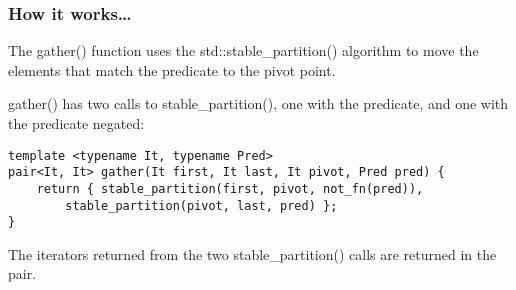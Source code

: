 \subsubsection{How it works…}

The gather() function uses the std::stable\_partition() algorithm to move the elements that match the predicate to the pivot point.

gather() has two calls to stable\_partition(), one with the predicate, and one with the predicate negated:

\begin{lstlisting}[style=styleCXX]
template <typename It, typename Pred>
pair<It, It> gather(It first, It last, It pivot, Pred pred) {
	return { stable_partition(first, pivot, not_fn(pred)),
		stable_partition(pivot, last, pred) };
}
\end{lstlisting}

The iterators returned from the two stable\_partition() calls are returned in the pair.










